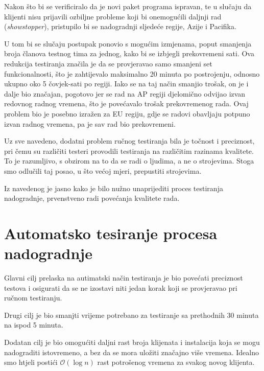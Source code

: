 Nakon što bi se verificiralo da je novi paket programa ispravan, te u slučaju da klijenti nisu prijavili ozbiljne probleme koji bi onemogućili daljnji rad (\emph{showstopper}), pristupilo bi se nadogradnji sljedeće regije, Azije i Pacifika.

U tom bi se slučaju postupak ponovio s mogućim izmjenama, poput smanjenja broja članova testnog tima za jednog, kako bi se izbjegli prekovremeni sati.
Ova redukcija testiranja značila je da se provjeravao samo smanjeni set funkcionalnosti, što je zahtijevalo maksimalno 20 minuta po postrojenju, odnosno ukupno oko 5 čovjek-sati po regiji.
Iako se na taj način smanjio trošak, on je i dalje bio značajan, pogotovo jer se rad na AP regiji djelomično odvijao izvan redovnog radnog vremena, što je povećavalo trošak prekovremenog rada.
Ovaj problem bio je posebno izražen za EU regiju, gdje se radovi obavljaju potpuno izvan radnog vremena, pa je sav rad bio prekovremeni.

Uz sve navedeno, dodatni problem ručnog testiranja bila je točnost i preciznost, pri čemu su različiti testeri provodili testiranja na različitim razinama kvalitete.
To je razumljivo, s obzirom na to da se radi o ljudima, a ne o strojevima.
Stoga smo odlučili taj posao, u što većoj mjeri, prepustiti strojevima.

Iz navedenog je jasno kako je bilo nužno unaprijediti proces testiranja nadogradnje, prvenstveno radi povećanja kvalitete rada.

\section{Automatsko tesiranje procesa nadogradnje}

Glavni cilj prelaska na autimatski način testiranja je bio povećati preciznost testova i osigurati da se ne izostavi niti jedan korak koji se provjeravao pri ručnom testiranju.

Drugi cilj je bio smanjti vrijeme potrebano za testiranje sa prethodnih 30 minuta na ispod 5 minuta.

Dodatan cilj je bio omogućiti daljni rast broja klijenata i instalacija koja se mogu nadograditi istovremeno, a bez da se mora uložiti značajno više vremena.
Idealno smo htjeli postići $\mathcal{O}(\log n)$ rast potrošenog vremena za svakog novog klijenta.


